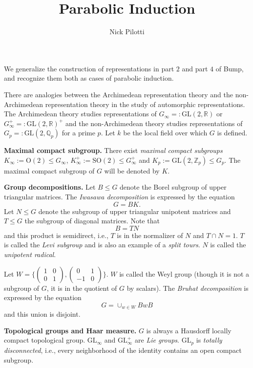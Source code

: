 \documentclass[12pt, letterpaper, twoside]
{article}
\title{Parabolic Induction}
\author{Nick Pilotti}
\newcommand{\Z}{{\mathbb Z}} %
\newcommand{\Q}{{\mathbb Q}} %
\newcommand{\R}{{\mathbb R}} %
\newcommand{\GL}{{\text{GL}}} %
\newcommand{\OR}{\text{O}} %
\newcommand{\SO}{\text{SO}} %
\begin{document}
\maketitle

We generalize the construction of representations in part $2$ and part $4$ of
Bump, and recognize them both as cases of parabolic induction. 

There are analogies between the Archimedean representation theory and the
non-Archimedean representation theory in the study of automorphic
representations. The Archimedean theory studies representations of $G_\infty =:
\GL(2, \R)$ or $G_\infty^+ =: \GL(2, \R)^+$ and the non-Archimedean theory
studies representations of $G_p =: \GL(2, \Q_p)$ for a prime $p$. Let $k$ be the
local field over which $G$ is defined.

\textbf{Maximal compact subgroup.} There exist \textit{maximal compact
subgroups} $K_\infty := \OR(2) \leq G_\infty$, $K_\infty^+ := \SO(2) \leq
G_\infty^+$ and $K_p := \GL(2, \Z_p) \leq G_p$. The maximal compact subgroup of
$G$ will be denoted by $K$.

\textbf{Group decompositions.} Let $B \leq G$ denote the Borel subgroup of upper
triangular matrices. The \textit{Iwasawa decomposition} is expressed by the
equation
\[G = BK.\] Let $N \leq G$ denote the subgroup of upper triangular unipotent
matrices and $T \leq G$ the subgroup of diagonal matrices. Note that
\[B = TN\] and this product is semidirect, i.e., $T$ is in the normalizer of $N$
and $T \cap N = 1$. $T$ is called the \textit{Levi subgroup} and is also an
example of a \textit{split tours}. $N$ is called the \textit{unipotent radical}.

Let $W = \bigg\{ \begin{pmatrix} 1 & 0 \\ 0 & 1 \end{pmatrix}, \begin{pmatrix} 0
& 1 \\ -1 & 0 \end{pmatrix}\bigg\}$. $W$ is called the Weyl group (though it is
not a subgroup of $G$, it is in the quotient of $G$ by scalars). The
\textit{Bruhat decomposition} is expressed by the equation
\[G = \cup_{w \in W} BwB\] and this union is disjoint.

\textbf{Topological groups and Haar measure.} $G$ is always a Hausdorff locally
compact topological group. $\GL_\infty$ and $\GL_\infty^+$ are \textit{Lie
groups}. $\GL_p$ is \textit{totally disconnected}, i.e., every neighborhood of
the identity contains an open compact subgroup. 
\end{document}
